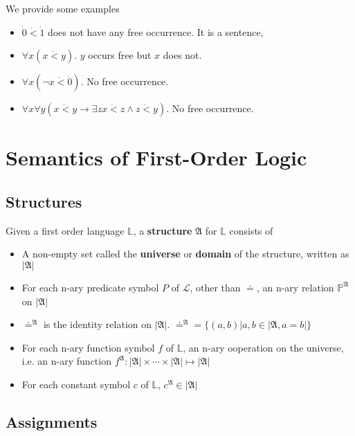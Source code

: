 We provide some examples

\begin{itemize}
    \item $\dot{0} \dot{<} \dot{1}$ does not have any free occurrence. It is a sentence,
    \item $\forall x(x\dot{<}y)$. $y$ occurs free but $x$ does not.
    \item $\forall x(\neg x \dot{<} \dot{0})$. No free occurrence.
    \item $\forall x\forall y (x \dot{<} y \to \exists z x\dot{<}z\wedge z\dot{<}y)$. No free occurrence.
\end{itemize}

\section{Semantics of First-Order Logic}

\subsection{Structures}

\begin{definition}
    Given a first order language $\mathbb{L}$, a \textbf{structure} $\mathfrak{A}$ for $\mathbb{L}$ consists of
    \begin{itemize}
        \item A non-empty set called the \textbf{universe} or \textbf{domain} of the structure, written as $|\mathfrak{A}|$
        \item For each n-ary predicate symbol $P$ of $\mathcal{L}$, other than $\doteq$, an n-ary relation $\mathbb{P}^{\mathfrak{A}}$ on $|\mathfrak{A}|$
        \item $\doteq^{\mathfrak{A}}$ is the identity relation on $|\mathfrak{A}|$. $\doteq^{\mathfrak{A}} = \{(a,b)|a,b\in|\mathfrak{A}, a =b|\}$
        \item For each n-ary function symbol $f$ of $\mathbb{L}$, an n-ary ooperation on the universe, i.e. an n-ary function $f^{\mathfrak{A}}: |\mathfrak{A}|\times\cdots\times|\mathfrak{A}|\mapsto|\mathfrak{A}|$
        \item For each constant symbol $c$ of $\mathbb{L}$, $c^{\mathfrak{A}}\in|\mathfrak{A}|$
    \end{itemize}
\end{definition}

\subsection{Assignments}

